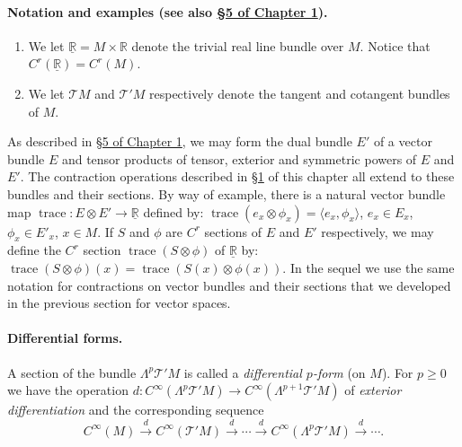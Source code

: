\paragraph{Notation and examples (see also \hyperref[sec:1:5]{\S5 of Chapter 1}).}
\begin{enumerate}
\item We let $\underline{\mathbb R}=M\times\mathbb R$ denote the trivial real line bundle over $M$. Notice that $C^r(\underline{\mathbb R})=C^r(M)$.
\item We let $\mathcal T M$ and $\mathcal T'M$ respectively denote the tangent and cotangent bundles of $M$.
\end{enumerate}
As described in \hyperref[sec:1:5]{\S5 of Chapter 1}, we may form the dual bundle $E'$ of a vector bundle $E$ and tensor products of tensor, exterior and symmetric powers of $E$ and $E'$. The contraction operations described in
\hyperref[sec:5:1]{\S1} of this chapter all extend to these bundles and their sections. By way of example, there is a natural vector bundle map $\operatorname{trace}:E\otimes E'\to\underline{\mathbb R}$ defined by: $\operatorname{trace}(e_x\otimes\phi_x)=\langle e_x,\phi_x\rangle$, $e_x\in E_x$, $\phi_x\in E'_x$, $x\in M$. If $S$ and $\phi$ are $C^r$ sections of $E$ and $E'$ respectively, we may define the $C^r$ section $\operatorname{trace}(S\otimes\phi)$ of $\underline{\mathbb R}$ by: $\operatorname{trace}(S\otimes\phi)(x)=\operatorname{trace}(S(x)\otimes\phi(x))$. In the sequel we use the same notation for contractions on vector bundles and their sections that we developed in the previous section for vector spaces.
\paragraph{Differential forms.} A section of the bundle $\Lambda^p\mathcal T'M$ is called a \emph{differential $p$-form} (on $M$). For $p\geq0$ we have the operation $d:C^\infty(\Lambda^p\mathcal T'M)\to C^\infty(\Lambda^{p+1}\mathcal T'M)$ of \emph{exterior differentiation} and the corresponding sequence
\[
C^\infty(M)\xrightarrow{d}C^\infty(\mathcal T'M)\xrightarrow{d}\cdots\xrightarrow{d}C^\infty(\Lambda^p\mathcal T'M)\xrightarrow{d}\cdots.
\]
